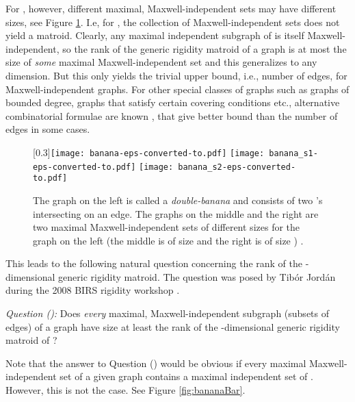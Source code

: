 \documentclass[10pt]{article}
\begin{document}
\medskip\noindent
For , however, different maximal, Maxwell-independent sets may
have different sizes, see Figure \ref{fig:banana}.
I.e, for , the collection of Maxwell-independent sets does
not yield a matroid.
Clearly, any maximal independent subgraph of 
is itself Maxwell-independent, so the rank of the generic rigidity matroid of a
graph is at most the
size of {\em some} maximal Maxwell-independent set and this
generalizes to any dimension.
But this only yields the trivial upper bound, i.e., number of edges, for Maxwell-independent graphs.
For other special classes of graphs such as graphs of
bounded degree, graphs that satisfy certain covering conditions
etc., alternative combinatorial formulae are known \cite{JacksonJordanrank:2006, JacksonJordansparse:2005}, that give better bound than the number of edges in some cases.

\begin{center}
\begin{figure}[!h]
\begin{center}
\scalebox{0.3}[0.3]{\texttt{[image: banana-eps-converted-to.pdf]} \texttt{[image: banana\_s1-eps-converted-to.pdf]} \texttt{[image: banana\_s2-eps-converted-to.pdf]}}
\end{center}
\caption{The graph on the left is called a {\em double-banana} and consists of two 's intersecting on an edge. The graphs on the middle and the right are two maximal Maxwell-independent sets of different sizes for the graph on the left (the middle is of size  and the right is of size )
.}\label{fig:banana}
\end{figure}
\end{center}
\medskip
\noindent
This leads to the following natural question concerning the rank of the -dimensional generic rigidity matroid. The question was posed by Tib\'or Jord\'an during the 2008 BIRS rigidity workshop \cite{bib:birs}.

\medskip
{\em Question ():}
Does {\it every} maximal, Maxwell-independent subgraph (subsets of edges) of a graph   have size at least the rank of the -dimensional generic rigidity matroid of ?

Note that the answer to Question () would be obvious if every maximal Maxwell-independent set of a given graph  contains a maximal independent set of . However, this is not the case. See Figure \ref{fig:bananaBar}.
\end{document}
